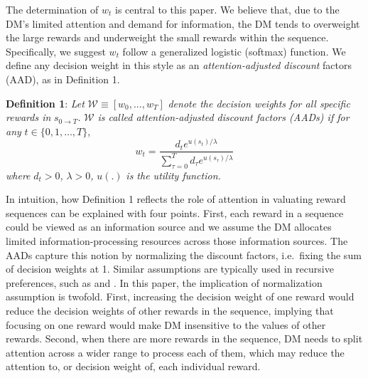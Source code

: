 \documentclass[
  12pt,
]{article}
\begin{document}
The determination of \(w_t\) is central to this paper. We believe that,
due to the DM's limited attention and demand for information, the DM
tends to overweight the large rewards and underweight the small rewards
within the sequence. Specifically, we suggest \(w_t\) follow a
generalized logistic (softmax) function. We define any decision weight
in this style as an \emph{attention-adjusted discount} factors (AAD), as
in Definition 1.

\noindent \textbf{Definition 1}: \emph{Let}
\(\mathcal{W}\equiv[w_0,...,w_T]\) \emph{denote the decision weights for
all specific rewards in} \(s_{0\rightarrow T}\)\emph{.} \(\mathcal{W}\)
\emph{is called attention-adjusted discount factors (AADs) if for any}
\(t\in\{0,1,…,T\}\),\[\tag{1}
w_t = \frac{d_te^{u(s_t)/\lambda}}{\sum_{\tau=0}^T d_\tau e^{u(s_\tau)/\lambda}} 
\]\emph{where} \(d_t > 0\)\emph{,} \(\lambda>0\)\emph{,} \(u(.)\)
\emph{is the utility function.}

In intuition, how Definition 1 reflects the role of attention in
valuating reward sequences can be explained with four points. First,
each reward in a sequence could be viewed as an information source and
we assume the DM allocates limited information-processing resources
across those information sources. The AADs capture this notion by
normalizing the discount factors, i.e.~fixing the sum of decision
weights at 1. Similar assumptions are typically used in recursive
preferences, such as \citet{epstein1989substitution} and
\citet{weil1990nonexpected}. In this paper, the implication of
normalization assumption is twofold. First, increasing the decision
weight of one reward would reduce the decision weights of other rewards
in the sequence, implying that focusing on one reward would make DM
insensitive to the values of other rewards. Second, when there are more
rewards in the sequence, DM needs to split attention across a wider
range to process each of them, which may reduce the attention to, or
decision weight of, each individual reward.
\end{document}
